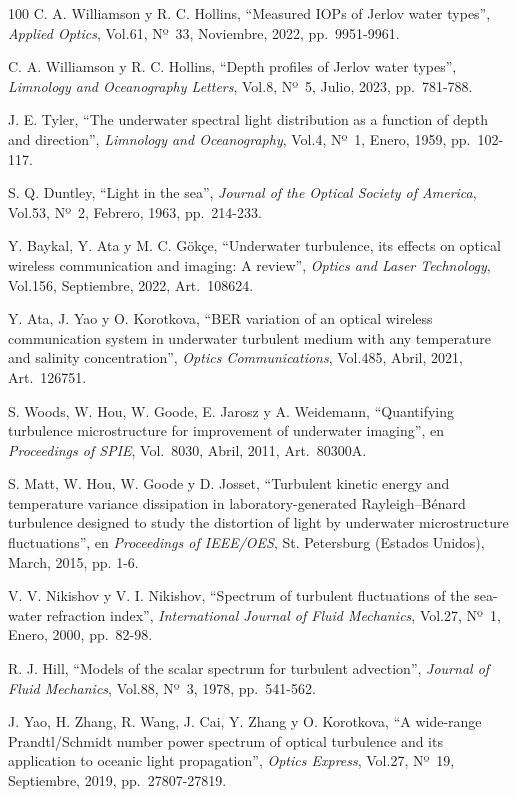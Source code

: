 \begin{thebibliography}{100}
C. A. Williamson y R. C. Hollins,
``Measured IOPs of Jerlov water types'',
\textit{Applied Optics},
Vol.61, Nº~33, Noviembre, 2022, pp.~9951-9961.

C. A. Williamson y R. C. Hollins,
``Depth profiles of Jerlov water types'',
\textit{Limnology and Oceanography Letters},
Vol.8, Nº~5, Julio, 2023, pp.~781-788.

J. E. Tyler,
``The underwater spectral light distribution as a function of depth and direction'',
\textit{Limnology and Oceanography},
Vol.4, Nº~1, Enero, 1959, pp.~102-117.

S. Q. Duntley,
``Light in the sea'',
\textit{Journal of the Optical Society of America},
Vol.53, Nº~2, Febrero, 1963, pp.~214-233.

Y. Baykal, Y. Ata y M. C. Gökçe,
``Underwater turbulence, its effects on optical wireless communication and imaging: A review'',
\textit{Optics and Laser Technology},
Vol.156, Septiembre, 2022, Art.~108624.

Y. Ata, J. Yao y O. Korotkova,
``BER variation of an optical wireless communication system in underwater turbulent medium with any temperature and salinity concentration'',
\textit{Optics Communications},
Vol.485, Abril, 2021, Art.~126751.

S. Woods, W. Hou, W. Goode, E. Jarosz y A. Weidemann,
``Quantifying turbulence microstructure for improvement of underwater imaging'',
en \textit{Proceedings of SPIE},
Vol.~8030, Abril, 2011, Art.~80300A.

  
S. Matt, W. Hou, W. Goode y D. Josset,
``Turbulent kinetic energy and temperature variance dissipation in laboratory-generated Rayleigh–Bénard turbulence designed to study the distortion of light by underwater microstructure fluctuations'',
en \textit{Proceedings of IEEE/OES}, St. Petersburg (Estados Unidos), March, 2015, pp. 1-6.

V. V. Nikishov y V. I. Nikishov,
``Spectrum of turbulent fluctuations of the sea-water refraction index'',
\textit{International Journal of Fluid Mechanics},
Vol.27, Nº~1, Enero, 2000, pp.~82-98.


R. J. Hill,
``Models of the scalar spectrum for turbulent advection'',
\textit{Journal of Fluid Mechanics},
Vol.88, Nº~3, 1978, pp.~541-562.

J. Yao, H. Zhang, R. Wang, J. Cai, Y. Zhang y O. Korotkova,
``A wide-range Prandtl/Schmidt number power spectrum of optical turbulence and its application to oceanic light propagation'',
\textit{Optics Express},
Vol.27, Nº~19, Septiembre, 2019, pp.~27807-27819.


\end{thebibliography}
